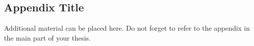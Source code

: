 \begin{appendix}
\chapter{Appendix Title}
\label{appendix:appendix}

Additional material can be placed here. Do not forget to refer to the appendix in the main part of your thesis.


\end{appendix}
